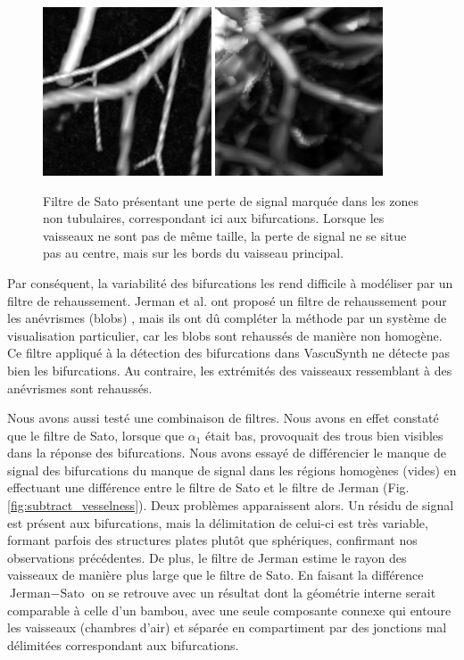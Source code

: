 \begin{figure}[ht]
    \centering
    \includegraphics[height=5cm]{Images/Vascu_2_k_Sato.png}
    \includegraphics[height=5cm]{Images/Ircad_k_Sato.png}
    \caption{Filtre de Sato présentant une perte de signal marquée dans les zones non tubulaires, correspondant ici aux bifurcations. Lorsque les vaisseaux ne sont pas de même taille, la perte de signal ne se situe pas au centre, mais sur les bords du vaisseau principal.}
    \label{fig:gradient_shift}
\end{figure}


Par conséquent, la variabilité des bifurcations les rend difficile à modéliser par un filtre de rehaussement. Jerman et al. ont proposé un filtre de rehaussement pour les anévrismes (blobs) \cite{Jerman2015_blobness}, mais ils ont dû compléter la méthode par un système de visualisation particulier, car les blobs sont rehaussés de manière non homogène. Ce filtre appliqué à la détection des bifurcations dans VascuSynth ne détecte pas bien les bifurcations. Au contraire, les extrémités des vaisseaux ressemblant à des anévrismes sont rehaussés.

Nous avons aussi testé une combinaison de filtres. Nous avons en effet constaté que le filtre de Sato, lorsque que $\alpha_1$ était bas, provoquait des trous bien visibles dans la réponse des bifurcations. Nous avons essayé de différencier le manque de signal des bifurcations du manque de signal dans les régions homogènes (vides) en effectuant une différence entre le filtre de Sato et le filtre de Jerman (Fig. \ref{fig:subtract_vesselness}). Deux problèmes apparaissent alors. Un résidu de signal est présent aux bifurcations, mais la délimitation de celui-ci est très variable, formant parfois des structures plates plutôt que sphériques, confirmant nos observations précédentes. De plus, le filtre de Jerman estime le rayon des vaisseaux de manière plus large que le filtre de Sato. En faisant la différence $\textrm{Jerman}-\textrm{Sato}$ on se retrouve avec un résultat dont la géométrie interne serait comparable à celle d'un bambou, avec une seule composante connexe qui entoure les vaisseaux (chambres d'air) et séparée en compartiment par des jonctions mal délimitées correspondant aux bifurcations.

